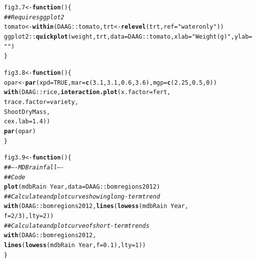 \documentclass[12pt, a4paper,  BCOR=8.25mm, DIV=15]{scrartcl}\usepackage[]{graphicx}\usepackage[]{color}
\makeatletter
\newcommand{\hlnum}[1]{\textcolor[rgb]{0.686,0.059,0.569}{#1}}%
\newcommand{\hlstr}[1]{\textcolor[rgb]{0.192,0.494,0.8}{#1}}%
\newcommand{\hlcom}[1]{\textcolor[rgb]{0.678,0.584,0.686}{\textit{#1}}}%
\newcommand{\hlopt}[1]{\textcolor[rgb]{0,0,0}{#1}}%
\newcommand{\hlstd}[1]{\textcolor[rgb]{0.345,0.345,0.345}{#1}}%
\newcommand{\hlkwa}[1]{\textcolor[rgb]{0.161,0.373,0.58}{\textbf{#1}}}%
\newcommand{\hlkwb}[1]{\textcolor[rgb]{0.69,0.353,0.396}{#1}}%
\newcommand{\hlkwc}[1]{\textcolor[rgb]{0.333,0.667,0.333}{#1}}%
\newcommand{\hlkwd}[1]{\textcolor[rgb]{0.737,0.353,0.396}{\textbf{#1}}}%
\newenvironment{kframe}{%
 \def\at@end@of@kframe{}%
 \ifinner\ifhmode%
  \def\at@end@of@kframe{\end{minipage}}%
  \begin{minipage}{\columnwidth}%
 \fi\fi%
 \def\FrameCommand##1{\hskip\@totalleftmargin \hskip-\fboxsep
 \colorbox{shadecolor}{##1}\hskip-\fboxsep
     \hskip-\linewidth \hskip-\@totalleftmargin \hskip\columnwidth}%
 \MakeFramed {\advance\hsize-\width
   \@totalleftmargin\z@ \linewidth\hsize
   \@setminipage}}%
 {\par\unskip\endMakeFramed%
 \at@end@of@kframe}
\newenvironment{knitrout}{}{} %
\makeatother
\begin{document}
\begin{knitrout}
\color{fgcolor}\begin{kframe}
\begin{alltt}
\hlstd{fig3.7} \hlkwb{<-} \hlkwa{function}\hlstd{()\{}
\hlcom{## Requires ggplot2}
\hlstd{tomato} \hlkwb{<-} \hlkwd{within}\hlstd{(DAAG}\hlopt{::}\hlstd{tomato, trt} \hlkwb{<-} \hlkwd{relevel}\hlstd{(trt,} \hlkwc{ref}\hlstd{=}\hlstr{"water only"}\hlstd{))}
\hlstd{ggplot2}\hlopt{::}\hlkwd{quickplot}\hlstd{(weight, trt,} \hlkwc{data}\hlstd{=DAAG}\hlopt{::}\hlstd{tomato,} \hlkwc{xlab}\hlstd{=}\hlstr{"Weight (g)"}\hlstd{,} \hlkwc{ylab}\hlstd{=}\hlstr{""}\hlstd{)}
\hlstd{\}}
\end{alltt}
\end{kframe}
\end{knitrout}

\begin{knitrout}
\color{fgcolor}\begin{kframe}
\begin{alltt}
\hlstd{fig3.8} \hlkwb{<-} \hlkwa{function}\hlstd{()\{}
\hlstd{opar} \hlkwb{<-} \hlkwd{par}\hlstd{(}\hlkwc{xpd}\hlstd{=}\hlnum{TRUE}\hlstd{,} \hlkwc{mar}\hlstd{=}\hlkwd{c}\hlstd{(}\hlnum{3.1}\hlstd{,}\hlnum{3.1}\hlstd{,}\hlnum{0.6}\hlstd{,}\hlnum{3.6}\hlstd{),} \hlkwc{mgp}\hlstd{=}\hlkwd{c}\hlstd{(}\hlnum{2.25}\hlstd{,} \hlnum{0.5}\hlstd{,} \hlnum{0}\hlstd{))}
\hlkwd{with}\hlstd{(DAAG}\hlopt{::}\hlstd{rice,} \hlkwd{interaction.plot}\hlstd{(}\hlkwc{x.factor}\hlstd{=fert,}
                            \hlkwc{trace.factor}\hlstd{=variety,}
                            \hlstd{ShootDryMass,}
                            \hlkwc{cex.lab}\hlstd{=}\hlnum{1.4}\hlstd{))}
\hlkwd{par}\hlstd{(opar)}
\hlstd{\}}
\end{alltt}
\end{kframe}
\end{knitrout}

\begin{knitrout}
\color{fgcolor}\begin{kframe}
\begin{alltt}
\hlstd{fig3.9} \hlkwb{<-} \hlkwa{function}\hlstd{()\{}
\hlcom{## ---- MDBrainfall ----}
\hlcom{## Code}
\hlkwd{plot}\hlstd{(mdbRain} \hlopt{~} \hlstd{Year,} \hlkwc{data}\hlstd{=DAAG}\hlopt{::}\hlstd{bomregions2012)}
\hlcom{## Calculate and plot curve showing long-term trend}
\hlkwd{with}\hlstd{(DAAG}\hlopt{::}\hlstd{bomregions2012,} \hlkwd{lines}\hlstd{(}\hlkwd{lowess}\hlstd{(mdbRain} \hlopt{~} \hlstd{Year,}
                           \hlkwc{f}\hlstd{=}\hlnum{2}\hlopt{/}\hlnum{3}\hlstd{),} \hlkwc{lty}\hlstd{=}\hlnum{2}\hlstd{))}
\hlcom{## Calculate and plot curve of short-term trends}
\hlkwd{with}\hlstd{(DAAG}\hlopt{::}\hlstd{bomregions2012,}
     \hlkwd{lines}\hlstd{(}\hlkwd{lowess}\hlstd{(mdbRain} \hlopt{~} \hlstd{Year,} \hlkwc{f}\hlstd{=}\hlnum{0.1}\hlstd{),} \hlkwc{lty}\hlstd{=}\hlnum{1}\hlstd{))}
\hlstd{\}}
\end{alltt}
\end{kframe}
\end{knitrout}
\end{document}
